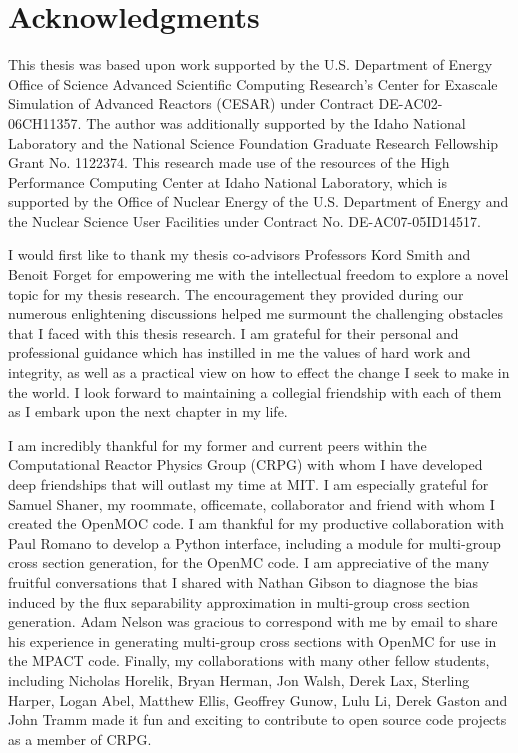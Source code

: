 \section*{Acknowledgments}

This thesis was based upon work supported by the U.S. Department of Energy Office of Science Advanced Scientific Computing Research's Center for Exascale Simulation of Advanced Reactors (CESAR) under Contract DE-AC02-06CH11357. The author was additionally supported by the Idaho National Laboratory and the National Science Foundation Graduate Research Fellowship Grant No. 1122374. This research made use of the resources of the High Performance Computing Center at Idaho National Laboratory, which is supported by the Office of Nuclear Energy of the U.S. Department of Energy and the Nuclear Science User Facilities under Contract No. DE-AC07-05ID14517.

I would first like to thank my thesis co-advisors Professors Kord Smith and Benoit Forget for empowering me with the intellectual freedom to explore a novel topic for my thesis research. The encouragement they provided during our numerous enlightening discussions helped me surmount the challenging obstacles that I faced with this thesis research. I am grateful for their personal and professional guidance which has instilled in me the values of hard work and integrity, as well as a practical view on how to effect the change I seek to make in the world. I look forward to maintaining a collegial friendship with each of them as I embark upon the next chapter in my life.

I am incredibly thankful for my former and current peers within the Computational Reactor Physics Group (CRPG) with whom I have developed deep friendships that will outlast my time at MIT. I am especially grateful for Samuel Shaner, my roommate, officemate, collaborator and friend with whom I created the OpenMOC code. I am thankful for my productive collaboration with Paul Romano to develop a Python interface, including a module for multi-group cross section generation, for the OpenMC code. I am appreciative of the many fruitful conversations that I shared with Nathan Gibson to diagnose the bias induced by the flux separability approximation in multi-group cross section generation. Adam Nelson was gracious to correspond with me by email to share his experience in generating multi-group cross sections with OpenMC for use in the MPACT code. Finally, my collaborations with many other fellow students, including Nicholas Horelik, Bryan Herman, Jon Walsh, Derek Lax, Sterling Harper, Logan Abel, Matthew Ellis, Geoffrey Gunow, Lulu Li, Derek Gaston and John Tramm made it fun and exciting to contribute to open source code projects as a member of CRPG.

